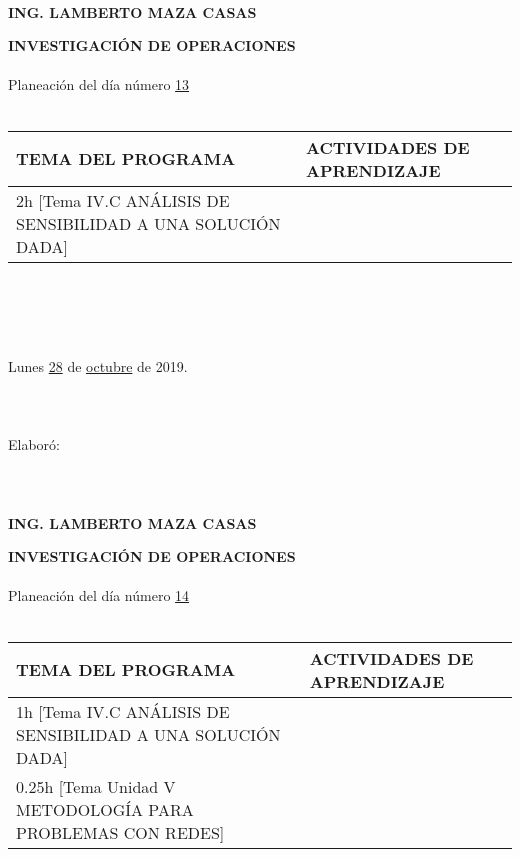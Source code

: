 \documentclass[landscape]{article}
\begin{document}
{\begin{center}
\ \\
{\bf ING. LAMBERTO MAZA CASAS}
\end{center}
\eject
\begin{center}
{\bf 
INVESTIGACI\'ON DE OPERACIONES
}
\ \\
\ \\
Planeaci\'on del d\'ia n\'umero \underline{\hspace{0.5cm}13\hspace{0.5cm}}
\ \\
\ \\
\begin{tabular}{|p{11cm}|p{8cm}|}\hline
{\bf TEMA DEL PROGRAMA}&{\bf ACTIVIDADES DE APRENDIZAJE}\\\hline
	2h	[Tema IV.C AN\'ALISIS DE SENSIBILIDAD A UNA SOLUCI\'ON DADA]
&\\
\hline
\end{tabular}
\ \\
\ \\
\ \\
\ \\
Lunes \underline{\hspace{0.5cm}28\hspace{0.5cm}} de  \underline{\hspace{0.5cm}octubre\hspace{0.5cm}} de 2019.
\ \\
\ \\
\ \\
\ \\
Elabor\'o:
\ \\
\ \\
\ \\
\ \\
{\bf ING. LAMBERTO MAZA CASAS}
\end{center}
\eject
\begin{center}
{\bf 
INVESTIGACI\'ON DE OPERACIONES
}
\ \\
\ \\
Planeaci\'on del d\'ia n\'umero \underline{\hspace{0.5cm}14\hspace{0.5cm}}
\ \\
\ \\
\begin{tabular}{|p{11cm}|p{8cm}|}\hline
{\bf TEMA DEL PROGRAMA}&{\bf ACTIVIDADES DE APRENDIZAJE}\\\hline
	1h	[Tema IV.C AN\'ALISIS DE SENSIBILIDAD A UNA SOLUCI\'ON DADA]
&\\
	0.25h	[Tema Unidad V METODOLOG\'IA PARA PROBLEMAS CON REDES]

\end{tabular}
\end{center}}
\end{document}
